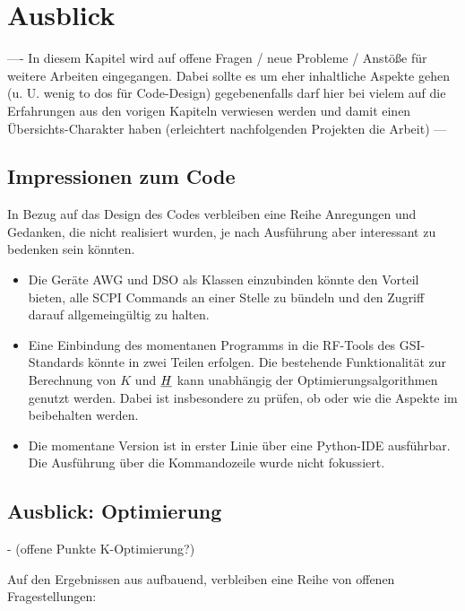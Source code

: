 \documentclass[../Report.tex]{subfiles}
\begin{document}
\chapter{Ausblick}
\label{chap:ausb}
---- In diesem Kapitel wird auf offene Fragen / neue Probleme / Anstöße für weitere Arbeiten eingegangen. Dabei sollte es um eher inhaltliche Aspekte gehen (u. U. wenig to dos für Code-Design) gegebenenfalls darf hier bei vielem auf die Erfahrungen aus den vorigen Kapiteln verwiesen werden und damit einen Übersichts-Charakter haben (erleichtert nachfolgenden Projekten die Arbeit) --- 

\section{Impressionen zum Code}
\label{sec:ausb.code}
In Bezug auf das Design des Codes verbleiben eine Reihe Anregungen und Gedanken, die nicht realisiert wurden, je nach Ausführung aber interessant zu bedenken sein könnten.

\begin{itemize}
	\item	Die Geräte AWG und DSO als Klassen einzubinden könnte den Vorteil bieten, alle SCPI Commands an einer Stelle zu bündeln und den Zugriff darauf allgemeingültig zu halten.
	
	\item	Eine Einbindung des momentanen Programms in die RF-Tools des GSI-Standards könnte in zwei Teilen erfolgen. Die bestehende Funktionalität zur Berechnung von $K$ und $\underline{H}$ kann unabhängig der Optimierungsalgorithmen genutzt werden. Dabei ist insbesondere zu prüfen, ob oder wie die Aspekte im  beibehalten werden. 
	
	\item 	Die momentane Version ist in erster Linie über eine Python-IDE ausführbar. Die Ausführung über die Kommandozeile wurde nicht fokussiert.
	
\end{itemize}





\section{Ausblick: Optimierung}
\label{sec:ausb.opti}

- (offene Punkte K-Optimierung?)


Auf den Ergebnissen aus  aufbauend, verbleiben eine Reihe von offenen Fragestellungen:
\end{document}
